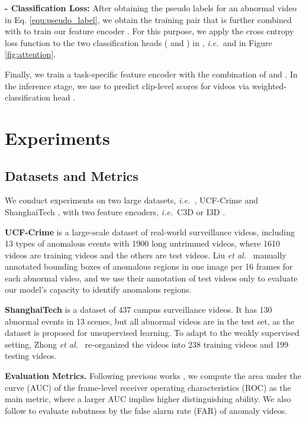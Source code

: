 \documentclass[final]{cvpr}
\newcommand{\ftnd}{\textcolor[rgb]{0.,0,0}}
\newcommand{\jcnd}{\textcolor[rgb]{0,0.,0}}
\newcommand{\jcca}{\textcolor[rgb]{0,0,0}}
\renewcommand{\ie}{\textit{i.e.\ }}
\newcommand{\et}{\textit{et al.\ }}
\begin{document}
\noindent\textbf{\ftnd{- Classification} Loss:} After obtaining the pseudo labels for an abnormal video in Eq. \ref{equ:pseudo_label}, we obtain the training pair  that is further combined with  to train our feature encoder . For this purpose, we apply the cross entropy loss function to the two classification heads ( and ) in , \ie  and  in Figure \ref{fig:attention}. 

\jcnd{Finally, we train a task-specific feature encoder  with the combination of  and . In the inference stage, we use  to predict clip-level scores for videos via weighted-classification head .}






\section{Experiments}
\subsection{Datasets and Metrics}
\vspace{-0.1cm}
We conduct experiments on two large datasets, \ie, UCF-Crime \cite{sultani2018real} and ShanghaiTech \cite{luo2017revisit}, with two feature encoders, \ie C3D \cite{tran2015learning} or I3D \cite{carreira2017quo}.

\noindent\textbf{UCF-Crime} is a large-scale dataset of real-world surveillance videos, including 13 types of anomalous events with 1900 long untrimmed videos, where 1610 videos are training videos and the others are test videos. Liu \et  \cite{liu2019exploring} manually annotated bounding boxes of anomalous regions in one image per 16 frames for each abnormal video, and we use their annotation of test videos only to evaluate our model's capacity to identify anomalous regions.

\noindent\textbf{ShanghaiTech} is a dataset of 437 campus surveillance videos. It has 130 abnormal events in 13 scenes, but all abnormal videos are in the test set, as the dataset is proposed for unsupervised learning. To adapt to the weakly supervised setting, Zhong \et  \cite{zhong2019graph} re-organized the videos into 238 training videos and 199 testing videos.

\noindent\jcca{\textbf{Evaluation Metrics.} Following previous works \cite{liu2018future,liu2019exploring,sultani2018real,wan2020weakly}, we compute the area under the curve (AUC) of the frame-level receiver operating characteristics (ROC) as the main metric, where a larger AUC implies higher distinguishing ability. We also follow \cite{sultani2018real,wan2020weakly} to evaluate robutness by the false alarm rate (FAR) of anomaly videos.}
\end{document}

